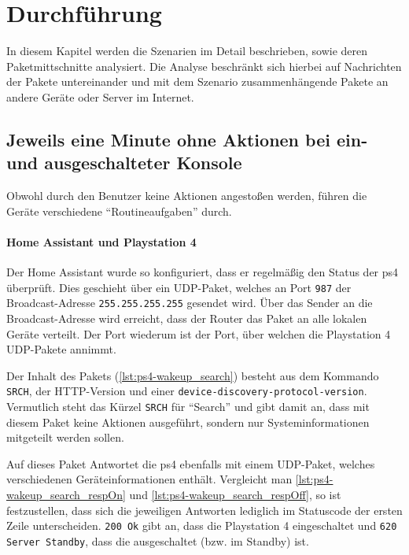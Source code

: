 \newpage
\section{Durchführung}\label{sec:durchfuehrung}
In diesem Kapitel werden die Szenarien im Detail beschrieben,
sowie deren Paketmittschnitte analysiert.
Die Analyse beschränkt sich hierbei auf Nachrichten der Pakete untereinander
und mit dem Szenario zusammenhängende Pakete an andere Geräte oder Server im Internet.


\subsection{Jeweils eine Minute ohne Aktionen bei ein- und ausgeschalteter Konsole}\label{sec:durchfuehrung-aus}
Obwohl durch den Benutzer keine Aktionen angestoßen werden,
führen die Geräte verschiedene \enquote{Routineaufgaben} durch.

\paragraph{Home Assistant und Playstation 4}
Der Home Assistant wurde so konfiguriert,
dass er regelmäßig den Status der \ac{ps4} überprüft.
Dies geschieht über ein UDP-Paket,
welches an Port \texttt{987} der Broadcast-Adresse \texttt{255.255.255.255} gesendet wird.
Über das Sender an die Broadcast-Adresse wird erreicht,
dass der Router das Paket an alle lokalen Geräte verteilt.
Der Port wiederum ist der Port, über welchen die Playstation 4 UDP-Pakete annimmt.


Der Inhalt des Pakets (\autoref{lst:ps4-wakeup_search}) besteht aus dem Kommando \texttt{SRCH},
der HTTP-Version und einer \texttt{device-discovery-protocol-version}.
Vermutlich steht das Kürzel \texttt{SRCH} für \enquote{Search} und gibt damit an,
dass mit diesem Paket keine Aktionen ausgeführt,
sondern nur Systeminformationen mitgeteilt werden sollen.



Auf dieses Paket Antwortet die \ac{ps4} ebenfalls mit einem UDP-Paket,
welches verschiedenen Geräteinformationen enthält.
Vergleicht man \autoref{lst:ps4-wakeup_search_respOn} und \autoref{lst:ps4-wakeup_search_respOff},
so ist festzustellen,
dass sich die jeweiligen Antworten lediglich im Statuscode der ersten Zeile unterscheiden.
\texttt{200 Ok} gibt an, dass die Playstation 4 eingeschaltet und \texttt{620 Server Standby},
dass die ausgeschaltet (bzw. im Standby) ist.

